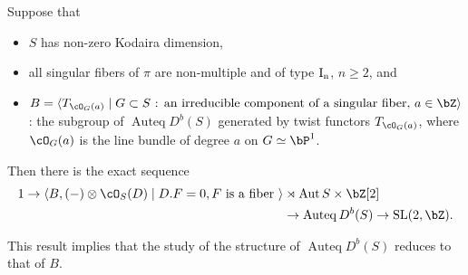 \documentclass[a0,landscape]{a0poster}
\theoremstyle{plain}
\theoremstyle{definition}
\DeclareMathOperator{\Auteq}{\mathrm{Auteq}}
\DeclareMathOperator{\Aut}{\mathrm{Aut}}
\DeclareMathOperator{\SL}{\mathrm{SL}}
\begin{document}
\begin{multicols}{3}
    \begin{tcolorbox}[
            colback = blue!10!white,
            colframe = blue!10!white,
            fonttitle = \bfseries,
            breakable = true]

        Suppose that
        \begin{itemize}
            \item $S$ has non-zero Kodaira dimension,
            \item all singular fibers of $\pi$ are non-multiple and of type $\rm{I}_n$, $n \geq 2$, and
            \item  $B = \langle T_{\cO_G(a)} \mid G \subset S \text{ : an irreducible component of a singular fiber, } a \in \bZ \rangle$: the subgroup of $\Auteq D^b(S)$ generated by twist functors $T_{\cO_G(a)}$, where $\cO_G(a)$ is the line bundle of degree $a$ on $G \simeq \bP^1$.
        \end{itemize}

        Then there is the exact sequence
        \begin{align*}
            1 \to \langle B, (-)\otimes \cO_S(D)\mid D.F=0, F \textrm{ is a fiber } \rangle & \rtimes \Aut{S} \times \bZ[2]      \\
                                                                                            & \to \Auteq{D^b(S)} \to \SL(2,\bZ).
        \end{align*}
    \end{tcolorbox}
    This result implies that the study of the structure of $\Auteq D^b(S)$ reduces to that of $B$.



    \color{Green}

\end{multicols}
\end{document}
